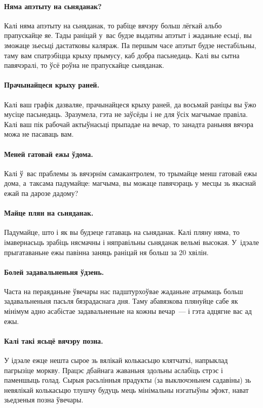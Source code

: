 \paragraph{Няма апэтыту на сьняданак?}
Калі няма апэтыту на сьняданак, то рабіце вячэру больш лёгкай альбо прапускайце яе. Тады раніцай у~вас будзе выдатны апэтыт і жаданьне есьці, вы зможаце зьесьці дастатковы каляраж. Па першым часе апэтыт будзе нестабільны, таму вам спатрэбіцца крыху прымусу, каб добра пасьнедаць. Калі вы сытна павячэралі, то ўсё роўна не прапускайце сьняданак.

\paragraph{Прачынайцеся крыху раней.}
Калі ваш графік дазваляе, прачынайцеся крыху раней, да восьмай раніцы вы ўжо мусіце пасьнедаць. Зразумела, гэта не заўсёды і не для ўсіх магчымае правіла. Калі ваш пік рабочай актыўнасьці прыпадае на вечар, то занадта раньняя вячэра можа не пасаваць вам.

\paragraph{Меней гатовай ежы ўдома.}
Калі ў~вас праблемы зь вячэрнім самакантролем, то трымайце менш гатовай ежы дома, а~таксама падумайце: магчыма, вы можаце павячэраць у~месцы зь якаснай ежай па дарозе дадому?

\paragraph{Майце плян на сьняданак.}
Падумайце, што і як вы будзеце гатаваць на сьняданак. Калі пляну няма, то імавернасьць зрабіць нясмачны і няправільны сьняданак вельмі высокая. У~ідэале прыгатаваньне ежы павінна заняць раніцай ня больш за 20 хвілін.

\paragraph{Болей задавальненьня ўдзень.}
Часта на пераяданьне ўвечары нас падштурхоўвае жаданьне атрымаць больш задавальненьня пасьля бязрадаснага дня. Таму абавязкова плянуйце сабе як мінімум адно асабістае задавальненьне на кожны вечар~--- і гэта адцягне вас ад ежы.

\paragraph{Калі такі ясьцё вячэру позна.}
У ідэале ежце нешта сырое зь вялікай колькасьцю клятчаткі, напрыклад пагрызіце моркву. Працэс дбайнага жаваньня здольны аслабіць стрэс і паменшыць голад. Сырыя расьлінныя прадукты (за выключэньнем садавіны) зь невялікай колькасьцю тлушчу будуць мець мінімальны нэгатыўны эфэкт, нават зьедзеныя позна ўвечары.
